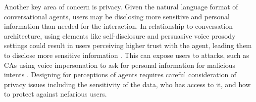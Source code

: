 Another key area of concern is privacy. Given the natural language format of conversational agents, users may be disclosing more sensitive and personal information than needed for the interaction. In relationship to conversation architecture, using elements like self-disclosure and persuasive voice prosody settings could result in users perceiving higher trust with the agent, leading them to disclose more sensitive information  \cite{dubiel2020persuasive, lee2020hear}\cmt{[60][23]}. This can expose users to attacks, such as CAs using voice impersonation to ask for personal information for malicious intents \cite{chan2021kinvoices}\cmt{[74]}. Designing for perceptions of agents requires careful consideration of privacy issues including the sensitivity of the data, who has access to it, and how to protect against nefarious users.